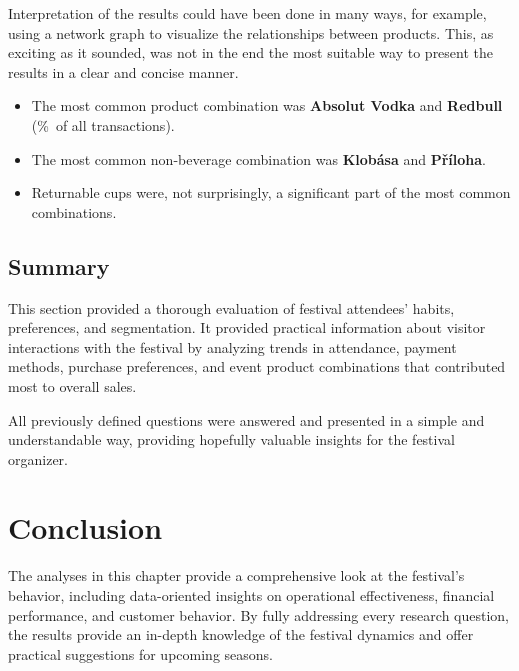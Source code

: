 Interpretation of the results could have been done in many ways, for example, using a network graph to visualize the relationships between products.
This, as exciting as it sounded, was not in the end the most suitable way to present the results in a clear and concise manner.

\begin{keytakeaways}
	\begin{itemize}
		\item The most common product combination was \textbf{Absolut Vodka} and \textbf{Redbull} (\%~of all transactions).
		\item The most common non-beverage combination was \textbf{Klobása} and \textbf{Příloha}.
		\item Returnable cups were, not surprisingly, a significant part of the most common combinations.
	\end{itemize}
\end{keytakeaways}

\subsection{Summary}
\label{subsec:analysis-customer-summary}

This section provided a thorough evaluation of festival attendees' habits, preferences, and segmentation.
It provided practical information about visitor interactions with the festival by analyzing trends in attendance, payment methods, purchase preferences, and event product combinations that contributed most to overall sales.

All previously defined questions were answered and presented in a simple and understandable way, providing hopefully valuable insights for the festival organizer.



\section{Conclusion}
\label{sec:analysis-conclusion}

The analyses in this chapter provide a comprehensive look at the festival's behavior, including data-oriented insights on operational effectiveness, financial performance, and customer behavior.
By fully addressing every research question, the results provide an in-depth knowledge of the festival dynamics and offer practical suggestions for upcoming seasons.

